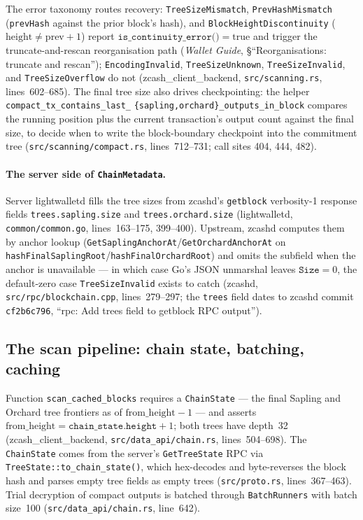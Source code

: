 \documentclass[11pt,a4paper]{article}
\theoremstyle{definition}
\begin{document}
The error taxonomy routes recovery: \texttt{TreeSizeMismatch},
\texttt{PrevHashMismatch} (\texttt{prevHash} against the prior block's
hash), and \texttt{BlockHeightDiscontinuity} ($\mathrm{height} \neq
\mathrm{prev}+1$) report $\texttt{is\_continuity\_error()} = \mathrm{true}$
and trigger the truncate-and-rescan reorganisation path (\emph{Wallet
Guide}, \S``Reorganisations: truncate and rescan'');
\texttt{EncodingInvalid}, \texttt{TreeSizeUnknown},
\texttt{TreeSizeInvalid}, and \texttt{TreeSizeOverflow} do not
(\textsf{zcash\_client\_backend}, \texttt{src/scanning.rs},
lines~602--685). The final tree size also drives checkpointing: the helper
\texttt{compact\_tx\_contains\_last\_}\allowbreak%
\texttt{\{sapling,orchard\}\_}\allowbreak\texttt{outputs\_in\_block}
compares the running position plus the current transaction's
output count against the final size, to decide when to write the
block-boundary checkpoint into the commitment tree
(\texttt{src/scanning/compact.rs}, lines~712--731; call sites 404, 444,
482).

\paragraph{The server side of \texttt{ChainMetadata}.}
Server \textsf{lightwalletd} fills the tree sizes from \textsf{zcashd}'s
\texttt{getblock} verbosity-1 response fields \texttt{trees.sapling.size}
and \texttt{trees.orchard.size} (\textsf{lightwalletd},
\texttt{common/common.go}, lines~163--175, 399--400). Upstream,
\textsf{zcashd} computes them by anchor lookup
(\texttt{GetSaplingAnchorAt}/\allowbreak\texttt{GetOrchardAnchorAt} on
\texttt{hashFinalSaplingRoot}/\allowbreak\texttt{hashFinalOrchardRoot})
and omits the
subfield when the anchor is unavailable --- in which case Go's JSON
unmarshal leaves $\texttt{Size} = 0$, the default-zero case
\texttt{TreeSizeInvalid} exists to catch (\textsf{zcashd},
\texttt{src/rpc/blockchain.cpp}, lines~279--297; the \texttt{trees} field
dates to \textsf{zcashd} commit \texttt{cf2b6c796}, ``rpc: Add trees field
to getblock RPC output'').

\subsection{The scan pipeline: chain state, batching, caching}%
\label{sec:sync-compact-pipeline}

Function \texttt{scan\_cached\_blocks} requires a \texttt{ChainState} ---
the final Sapling and Orchard tree frontiers as of
$\mathrm{from\_height} - 1$ --- and asserts $\mathrm{from\_height} =
\texttt{chain\_state.height} + 1$; both trees have depth~32
(\textsf{zcash\_client\_backend}, \texttt{src/data\_api/chain.rs},
lines~504--698). The \texttt{ChainState} comes from the server's
\texttt{GetTreeState} RPC via \texttt{TreeState::to\_chain\_state()}, which
hex-decodes and byte-reverses the block hash and parses empty tree fields as
empty trees (\texttt{src/proto.rs}, lines~367--463). Trial decryption of
compact outputs is batched through \texttt{BatchRunners} with batch
size~100 (\texttt{src/data\_api/chain.rs}, line~642).
\end{document}
